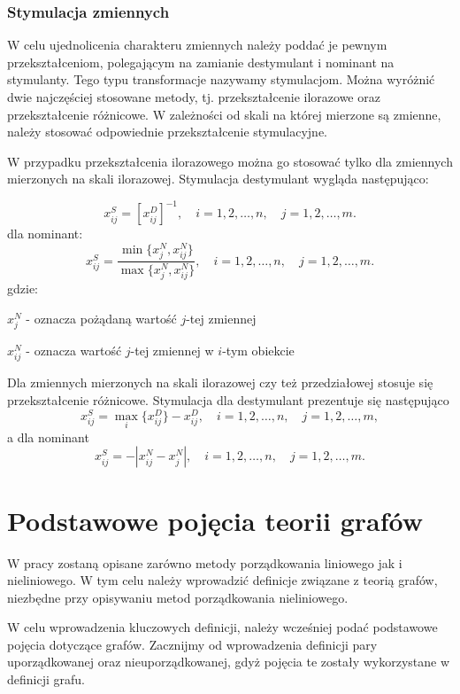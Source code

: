 \documentclass[12pt,a4paper]{report}
\begin{document}
\subsubsection{Stymulacja zmiennych}
W celu ujednolicenia charakteru zmiennych należy poddać je pewnym przekształceniom, polegającym na zamianie destymulant i nominant na stymulanty. Tego typu transformacje nazywamy stymulacjom. Można wyróżnić dwie najczęściej stosowane metody, tj. przekształcenie ilorazowe oraz przekształcenie różnicowe. W zależności od skali na której mierzone są zmienne, należy stosować odpowiednie przekształcenie stymulacyjne.

W przypadku przekształcenia ilorazowego można go stosować tylko dla zmiennych mierzonych na skali ilorazowej. Stymulacja destymulant wygląda następująco:


$$
x_{ij}^{S}=[x_{ij}^{D}]^{-1},  \quad i = 1,2, \ldots, n, \quad j=1,2,\ldots, m.
$$
dla nominant:
$$
x_{ij}^{S}=\frac{\min\{x_{j}^{N},x_{ij}^{N}\}}{\max\{x_{j}^{N},x_{ij}^{N}\}}, \quad i = 1,2, \ldots, n, \quad j=1,2,\ldots, m.
$$
gdzie:

$x_{j}^{N}$ - oznacza pożądaną wartość $j$-tej zmiennej

$x_{ij}^{N}$ - oznacza wartość $j$-tej zmiennej w $i$-tym obiekcie


Dla zmiennych mierzonych na skali ilorazowej czy też przedziałowej stosuje się przekształcenie różnicowe. Stymulacja dla destymulant prezentuje się następująco
$$
x_{ij}^{S}=\max\limits_{i} \{x_{ij}^{D}\} - x_{ij}^{D}, \quad i = 1,2, \ldots, n, \quad j=1,2,\ldots, m,
$$
a dla nominant
$$
x_{ij}^{S}=-|x_{ij}^{N}-x_{j}^{N}|, \quad i = 1,2, \ldots, n, \quad j=1,2,\ldots, m.
$$


\section{Podstawowe pojęcia teorii grafów}\label{grafy} %
W pracy zostaną opisane zarówno metody porządkowania liniowego jak i nieliniowego. W tym celu należy wprowadzić definicje związane z teorią grafów, niezbędne przy opisywaniu metod porządkowania nieliniowego.


W celu wprowadzenia kluczowych definicji, należy wcześniej podać podstawowe pojęcia dotyczące grafów. Zacznijmy od wprowadzenia definicji pary uporządkowanej oraz nieuporządkowanej, gdyż pojęcia te zostały wykorzystane w definicji grafu.
\end{document}
